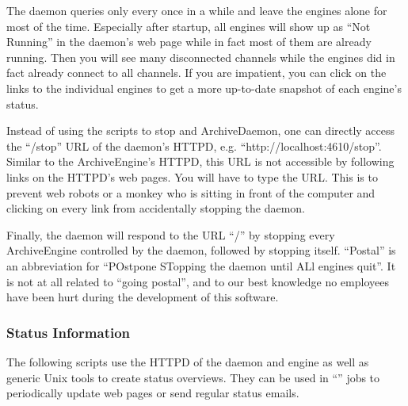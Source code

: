 \NOTE The daemon queries only every once in a while and leave the
engines alone for most of the time.
Especially after startup, all engines will show up as ``Not Running''
in the daemon's web page while in fact most of them are already
running. Then you will see many disconnected channels while the
engines did in fact already connect to all channels. 
If you are impatient, you can click on the links to the individual
engines to get a more up-to-date snapshot of each engine's status.

Instead of using the scripts to stop and ArchiveDaemon, one can
directly access the ``/stop'' URL of the daemon's HTTPD,
e.g. ``http://localhost:4610/stop''.  Similar to the ArchiveEngine's
HTTPD, this URL is not accessible by following links on the HTTPD's
web pages. You will have to type the URL. This is to prevent web
robots or a monkey who is sitting in front of the computer and
clicking on every link from accidentally stopping the daemon.

Finally, the daemon will respond to the URL ``/'' by stopping
every ArchiveEngine controlled by the daemon, followed by stopping
itself. ``Postal'' is an abbreviation for ``POstpone STopping the
daemon until ALl engines quit''. It is not at all related to ``going
postal'', and to our best knowledge no  employees have been hurt
during the development of this software.

\subsubsection{Status Information} \label{sec:example:statustools}
The following scripts use the HTTPD of the daemon and engine
as well as generic Unix tools to create status overviews.
They can be used in ``'' jobs to periodically update
web pages or send regular status emails.

